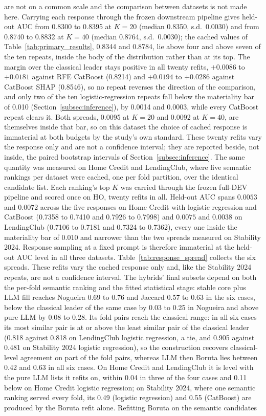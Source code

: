 \documentclass[final,5p,twocolumn]{elsarticle}
\newcommand{\Kfeat}{K}
\begin{document}
are not on a common scale and the comparison between datasets is not made here. Carrying each response through the frozen downstream pipeline gives held-out AUC from 0.8300 to 0.8395 at $\Kfeat=20$ (median 0.8350, s.d.\ 0.0030) and from 0.8740 to 0.8832 at $\Kfeat=40$ (median 0.8764, s.d.\ 0.0030); the cached values of Table~\ref{tab:primary_results}, 0.8344 and 0.8784, lie above four and above seven of the ten repeats, inside the body of the distribution rather than at its top. The margin over the classical leader stays positive in all twenty refits, $+0.0086$ to $+0.0181$ against RFE CatBoost (0.8214) and $+0.0194$ to $+0.0286$ against CatBoost SHAP (0.8546), so no repeat reverses the direction of the comparison, and only two of the ten logistic-regression repeats fall below the materiality bar of 0.010 (Section~\ref{subsec:inference}), by 0.0014 and 0.0003, while every CatBoost repeat clears it. Both spreads, 0.0095 at $\Kfeat=20$ and 0.0092 at $\Kfeat=40$, are themselves inside that bar, so on this dataset the choice of cached response is immaterial at both budgets by the study's own standard. These twenty refits vary the response only and are not a confidence interval; they are reported beside, not inside, the paired bootstrap intervals of Section~\ref{subsec:inference}. The same quantity was measured on Home Credit and LendingClub, where five semantic rankings per dataset were cached, one per fold partition, over the identical candidate list. Each ranking's top $\Kfeat$ was carried through the frozen full-DEV pipeline and scored once on HO, twenty refits in all. Held-out AUC spans $0.0053$ and $0.0072$ across the five responses on Home Credit with logistic regression and CatBoost (0.7358 to 0.7410 and 0.7926 to 0.7998) and $0.0075$ and $0.0038$ on LendingClub (0.7106 to 0.7181 and 0.7324 to 0.7362), every one inside the materiality bar of $0.010$ and narrower than the two spreads measured on Stability 2024. Response sampling at a fixed prompt is therefore immaterial at the held-out AUC level in all three datasets. Table~\ref{tab:response_spread} collects the six spreads. These refits vary the cached response only and, like the Stability 2024 repeats, are not a confidence interval. The hybrids' final subsets depend on both the per-fold semantic ranking and the fitted statistical stage: stable core plus LLM fill reaches Nogueira 0.69 to 0.76 and Jaccard 0.57 to 0.63 in the six cases, below the classical leader of the same case by 0.03 to 0.25 in Nogueira and above pure LLM by 0.08 to 0.28. Its fold pairs reach the classical range: in all six cases its most similar pair is at or above the least similar pair of the classical leader (0.818 against 0.818 on LendingClub logistic regression, a tie, and 0.905 against 0.481 on Stability 2024 logistic regression), so the construction recovers classical-level agreement on part of the fold pairs, whereas LLM then Boruta lies between 0.42 and 0.63 in all six cases. On Home Credit and LendingClub it is level with the pure LLM lists it refits on, within 0.04 in three of the four cases and 0.11 below on Home Credit logistic regression; on Stability 2024, where one semantic ranking served every fold, its 0.49 (logistic regression) and 0.55 (CatBoost) are produced by the Boruta refit alone. Refitting Boruta on the semantic candidates 
\end{document}
